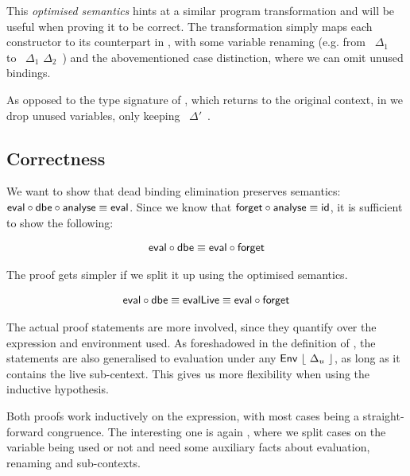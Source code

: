 \documentclass[11pt,a4paper]{article}
\newcommand{\AgdaFloor}[1]{\AgdaFunction{$\lfloor$}\ #1\ \AgdaFunction{$\rfloor$}}
\begin{document}
This \emph{optimised semantics} hints at a similar program transformation
and will be useful when proving it to be correct.
The transformation simply maps each constructor to its counterpart in ,
with some variable renaming
(e.g. from \AgdaFloor{$\Delta_1$} to \AgdaFloor{$\Delta_1$ \AgdaFunction{$\cup$} $\Delta_2$})
and the abovementioned case distinction,
where we can omit unused bindings.

\CodeLiveDbe
\CodeLiveRestrictedRefSignature

As opposed to the type signature of ,
which returns to the original context,
in  we drop unused variables, only keeping \AgdaFloor{$\Delta'$}.


\subsection{Correctness}

We want to show that dead binding elimination preserves semantics:
$\AgdaFunction{eval} \circ \AgdaFunction{dbe} \circ \AgdaFunction{analyse} \equiv \AgdaFunction{eval}$.
Since we know that $\AgdaFunction{forget} \circ \AgdaFunction{analyse} \equiv \AgdaFunction{id}$,
it is sufficient to show the following:

\begin{align*}
  \AgdaFunction{eval} \circ \AgdaFunction{dbe}
    \equiv \AgdaFunction{eval} \circ \AgdaFunction{forget}
\end{align*}

The proof gets simpler if we split it up using the optimised semantics.

\begin{align*}
  \AgdaFunction{eval} \circ \AgdaFunction{dbe}
    \equiv \AgdaFunction{evalLive}
    \equiv \AgdaFunction{eval} \circ \AgdaFunction{forget}
\end{align*}

The actual proof statements are more involved,
since they quantify over the expression and environment used.
As foreshadowed in the definition of , the statements are also generalised
to evaluation under any $\AgdaDatatype{Env}\ \AgdaFloor{\Delta_u}$,
as long as it contains the live sub-centext.
This gives us more flexibility when using the inductive hypothesis.

\CodeLiveDbeCorrectSignature
\CodeLiveEvalLiveCorrectSignature

Both proofs work inductively on the expression, with most cases being a straight-forward congruence.
The interesting one is again ,
where we split cases on the variable being used or not
and need some auxiliary facts about evaluation, renaming and sub-contexts.
\end{document}
